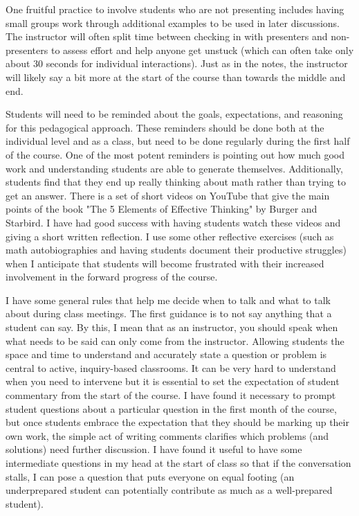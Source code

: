 \begin{annotation}
One fruitful practice to involve students who are not presenting includes having small groups work through additional examples to be used in later discussions. The instructor will often split time between checking in with presenters and non-presenters to assess effort and help anyone get unstuck (which can often take only about 30 seconds for individual interactions). Just as in the notes, the instructor will likely say a bit more at the start of the course than towards the middle and end.

Students will need to be reminded about the goals, expectations, and reasoning for this pedagogical approach. These reminders should be done both at the individual level and as a class, but need to be done regularly during the first half of the course. One of the most potent reminders is pointing out how much good work and understanding students are able to generate themselves. Additionally, students find that they end up really thinking about math rather than trying to get an answer. There is a set of short videos on YouTube that give the main points of the book "The 5 Elements of Effective Thinking" by Burger and Starbird. I have had good success with having students watch these videos and giving a short written reflection. I use some other reflective exercises (such as math autobiographies and having students document their productive struggles) when I anticipate that students will become frustrated with their increased involvement in the forward progress of the course.

I have some general rules that help me decide when to talk and what to talk about during class meetings. The first guidance is to not say anything that a student can say. By this, I mean that as an instructor, you should speak when what needs to be said can only come from the instructor. Allowing students the space and time to understand and accurately state a question or problem is central to active, inquiry-based classrooms. It can be very hard to understand when you need to intervene but it is essential to set the expectation of student commentary from the start of the course. I have found it necessary to prompt student questions about a particular question in the first month of the course, but once students embrace the expectation that they should be marking up their own work, the simple act of writing comments clarifies which problems (and solutions) need further discussion. I have found it useful to have some intermediate questions in my head at the start of class so that if the conversation stalls, I can pose a question that puts everyone on equal footing (an underprepared student can potentially contribute as much as a well-prepared student).



\end{annotation}
